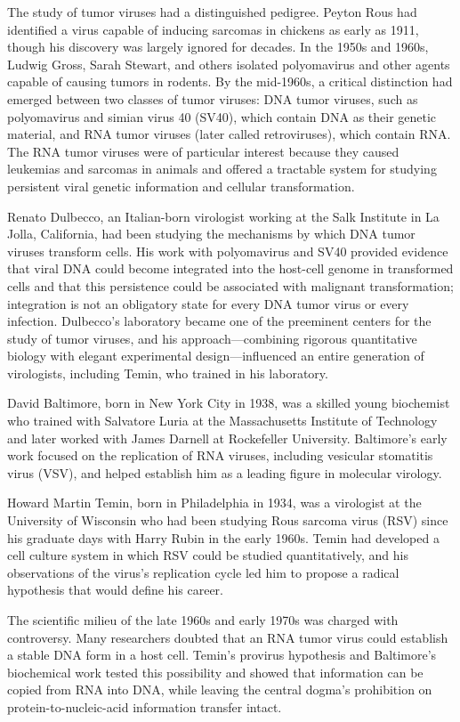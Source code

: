 The study of tumor viruses had a distinguished pedigree. Peyton Rous had identified a virus capable of inducing sarcomas in chickens as early as 1911, though his discovery was largely ignored for decades. In the 1950s and 1960s, Ludwig Gross, Sarah Stewart, and others isolated polyomavirus and other agents capable of causing tumors in rodents. By the mid-1960s, a critical distinction had emerged between two classes of tumor viruses: DNA tumor viruses, such as polyomavirus and simian virus 40 (SV40), which contain DNA as their genetic material, and RNA tumor viruses (later called retroviruses), which contain RNA. The RNA tumor viruses were of particular interest because they caused leukemias and sarcomas in animals and offered a tractable system for studying persistent viral genetic information and cellular transformation.

Renato Dulbecco, an Italian-born virologist working at the Salk Institute in La Jolla, California, had been studying the mechanisms by which DNA tumor viruses transform cells. His work with polyomavirus and SV40 provided evidence that viral DNA could become integrated into the host-cell genome in transformed cells and that this persistence could be associated with malignant transformation; integration is not an obligatory state for every DNA tumor virus or every infection. Dulbecco's laboratory became one of the preeminent centers for the study of tumor viruses, and his approach---combining rigorous quantitative biology with elegant experimental design---influenced an entire generation of virologists, including Temin, who trained in his laboratory.

David Baltimore, born in New York City in 1938, was a skilled young biochemist who trained with Salvatore Luria at the Massachusetts Institute of Technology and later worked with James Darnell at Rockefeller University. Baltimore's early work focused on the replication of RNA viruses, including vesicular stomatitis virus (VSV), and helped establish him as a leading figure in molecular virology.

Howard Martin Temin, born in Philadelphia in 1934, was a virologist at the University of Wisconsin who had been studying Rous sarcoma virus (RSV) since his graduate days with Harry Rubin in the early 1960s. Temin had developed a cell culture system in which RSV could be studied quantitatively, and his observations of the virus's replication cycle led him to propose a radical hypothesis that would define his career.

The scientific milieu of the late 1960s and early 1970s was charged with controversy. Many researchers doubted that an RNA tumor virus could establish a stable DNA form in a host cell. Temin's provirus hypothesis and Baltimore's biochemical work tested this possibility and showed that information can be copied from RNA into DNA, while leaving the central dogma's prohibition on protein-to-nucleic-acid information transfer intact.

